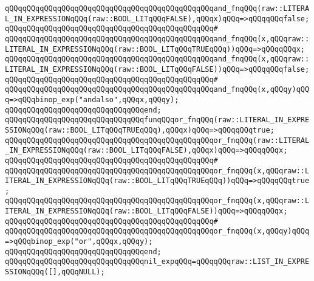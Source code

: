 \verb|qQQqqQQqqQQqqQQqqQQqqQQqqQQqqQQqqQQqqQQqqQQqqQQqand_fnqQQq(raw::LITERAL_IN_EXPRESSIONqQQq(raw::BOOL_LITqQQqFALSE),qQQqx)qQQq=>qQQqqQQqfalse;|\newline
\verb|qQQqqQQqqQQqqQQqqQQqqQQqqQQqqQQqqQQqqQQqqQQqqQQq#|\newline
\verb|qQQqqQQqqQQqqQQqqQQqqQQqqQQqqQQqqQQqqQQqqQQqqQQqand_fnqQQq(x,qQQqraw::LITERAL_IN_EXPRESSIONqQQq(raw::BOOL_LITqQQqTRUEqQQq))qQQq=>qQQqqQQqx;|\newline
\verb|qQQqqQQqqQQqqQQqqQQqqQQqqQQqqQQqqQQqqQQqqQQqqQQqand_fnqQQq(x,qQQqraw::LITERAL_IN_EXPRESSIONqQQq(raw::BOOL_LITqQQqFALSE))qQQq=>qQQqqQQqfalse;|\newline
\verb|qQQqqQQqqQQqqQQqqQQqqQQqqQQqqQQqqQQqqQQqqQQqqQQq#|\newline
\verb|qQQqqQQqqQQqqQQqqQQqqQQqqQQqqQQqqQQqqQQqqQQqqQQqand_fnqQQq(x,qQQqy)qQQq=>qQQqbinop_exp("andalso",qQQqx,qQQqy);|\newline
\verb|qQQqqQQqqQQqqQQqqQQqqQQqqQQqqQQqend;|\newline
\newline
\verb|qQQqqQQqqQQqqQQqqQQqqQQqqQQqqQQqfunqQQqor_fnqQQq(raw::LITERAL_IN_EXPRESSIONqQQq(raw::BOOL_LITqQQqTRUEqQQq),qQQqx)qQQq=>qQQqqQQqtrue;|\newline
\verb|qQQqqQQqqQQqqQQqqQQqqQQqqQQqqQQqqQQqqQQqqQQqqQQqor_fnqQQq(raw::LITERAL_IN_EXPRESSIONqQQq(raw::BOOL_LITqQQqFALSE),qQQqx)qQQq=>qQQqqQQqx;|\newline
\verb|qQQqqQQqqQQqqQQqqQQqqQQqqQQqqQQqqQQqqQQqqQQqqQQq#|\newline
\verb|qQQqqQQqqQQqqQQqqQQqqQQqqQQqqQQqqQQqqQQqqQQqqQQqor_fnqQQq(x,qQQqraw::LITERAL_IN_EXPRESSIONqQQq(raw::BOOL_LITqQQqTRUEqQQq))qQQq=>qQQqqQQqtrue;|\newline
\verb|qQQqqQQqqQQqqQQqqQQqqQQqqQQqqQQqqQQqqQQqqQQqqQQqor_fnqQQq(x,qQQqraw::LITERAL_IN_EXPRESSIONqQQq(raw::BOOL_LITqQQqFALSE))qQQq=>qQQqqQQqx;|\newline
\verb|qQQqqQQqqQQqqQQqqQQqqQQqqQQqqQQqqQQqqQQqqQQqqQQq#|\newline
\verb|qQQqqQQqqQQqqQQqqQQqqQQqqQQqqQQqqQQqqQQqqQQqqQQqor_fnqQQq(x,qQQqy)qQQq=>qQQqbinop_exp("or",qQQqx,qQQqy);|\newline
\verb|qQQqqQQqqQQqqQQqqQQqqQQqqQQqqQQqend;|\newline
\newline
\verb|qQQqqQQqqQQqqQQqqQQqqQQqqQQqqQQqnil_expqQQq=qQQqqQQqraw::LIST_IN_EXPRESSIONqQQq([],qQQqNULL);|\newline
\newline
\newline
